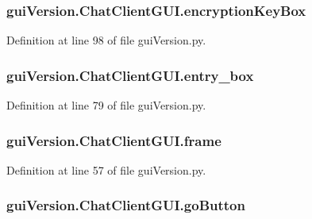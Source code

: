 \subsubsection[{encryption\+Key\+Box}]{\setlength{\rightskip}{0pt plus 5cm}gui\+Version.\+Chat\+Client\+G\+U\+I.\+encryption\+Key\+Box}\label{classgui_version_1_1_chat_client_g_u_i_a61e070d785a0e8308bf1a26788075258}


Definition at line 98 of file gui\+Version.\+py.

\hypertarget{classgui_version_1_1_chat_client_g_u_i_a4436c621e5f3c806218c2756edf488f7}{}
\subsubsection[{entry\+\_\+box}]{\setlength{\rightskip}{0pt plus 5cm}gui\+Version.\+Chat\+Client\+G\+U\+I.\+entry\+\_\+box}\label{classgui_version_1_1_chat_client_g_u_i_a4436c621e5f3c806218c2756edf488f7}


Definition at line 79 of file gui\+Version.\+py.

\hypertarget{classgui_version_1_1_chat_client_g_u_i_a7809572437bc7888072cb612990da273}{}
\subsubsection[{frame}]{\setlength{\rightskip}{0pt plus 5cm}gui\+Version.\+Chat\+Client\+G\+U\+I.\+frame}\label{classgui_version_1_1_chat_client_g_u_i_a7809572437bc7888072cb612990da273}


Definition at line 57 of file gui\+Version.\+py.

\hypertarget{classgui_version_1_1_chat_client_g_u_i_a5a09ecaf8a2c39309f7b7acdea272bc5}{}
\subsubsection[{go\+Button}]{\setlength{\rightskip}{0pt plus 5cm}gui\+Version.\+Chat\+Client\+G\+U\+I.\+go\+Button}\label{classgui_version_1_1_chat_client_g_u_i_a5a09ecaf8a2c39309f7b7acdea272bc5}


